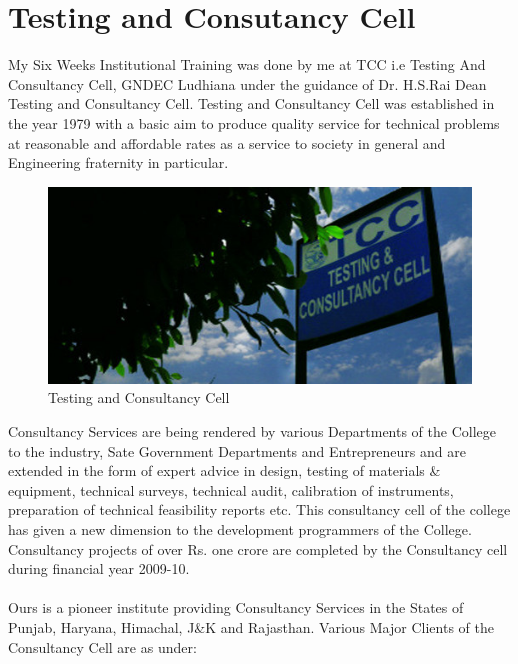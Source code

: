 \section{Testing and Consutancy Cell}
My Six Weeks Institutional Training was done by me at TCC i.e Testing And
Consultancy Cell,
GNDEC Ludhiana under the guidance of Dr. H.S.Rai Dean Testing and Consultancy Cell.
Testing and Consultancy Cell was established in the year 1979 with a basic aim to produce
quality service for technical problems at reasonable and affordable rates as a service to society
in general and Engineering fraternity in particular.\\
\begin{figure}[ht]
\centering
\includegraphics[scale=0.9]{images/aw.jpg}
\caption{Testing and Consultancy Cell}
\end{figure}
\hspace{-1.7em} Consultancy Services are being rendered by various Departments of the College to the
industry, Sate Government Departments and Entrepreneurs and are extended in the form of
expert advice in design, testing of materials \& equipment, technical surveys, technical audit,
calibration of instruments, preparation of technical feasibility reports etc.
This consultancy cell of the college has given a new dimension to the development
programmers of the College. Consultancy projects of over Rs. one crore are completed by the
Consultancy cell during financial year 2009-10. \\ \\
Ours is a pioneer institute providing Consultancy Services in the States of Punjab, Haryana,
Himachal, J\&K and Rajasthan. Various Major Clients of the Consultancy Cell are as under:\\
